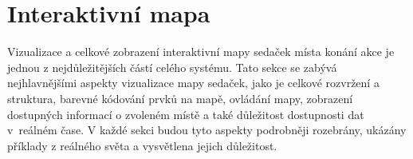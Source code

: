 \section{Interaktivní mapa}
\label{sec:identifikace-interaktivni-mapa}
Vizualizace a celkové zobrazení interaktivní mapy sedaček místa konání akce je jednou z nejdůležitějších částí celého systému.
Tato sekce se zabývá nejhlavnějšími aspekty vizualizace mapy sedaček, jako je celkové rozvržení a struktura, barevné kódování prvků na mapě, ovládání mapy, zobrazení dostupných informací o zvoleném místě a také důležitost dostupnosti dat v~reálném čase.
V každé sekci budou tyto aspekty podrobněji rozebrány, ukázány příklady z reálného světa a vysvětlena jejich důležitost.


